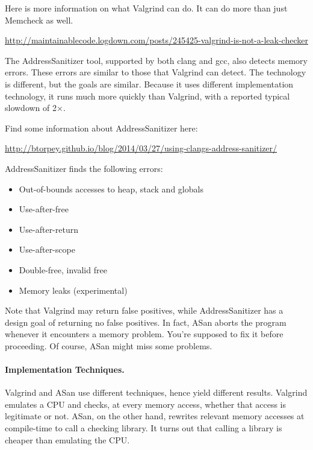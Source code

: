 \documentclass[11pt]{article}
\begin{document}
Here is more information on what Valgrind can do. It can do more than just
Memcheck as well.
\begin{center}
\url{http://maintainablecode.logdown.com/posts/245425-valgrind-is-not-a-leak-checker}
\end{center}

The AddressSanitizer tool, supported by both clang and gcc,
also detects memory errors. These errors are similar to those that
Valgrind can detect. The technology is different, but the goals are
similar. Because it uses different implementation technology, it runs
much more quickly than Valgrind, with a reported typical slowdown of
2$\times$.

\pagebreak
Find some information about AddressSanitizer here:
\vspace*{-1em}
\begin{center}
\url{http://btorpey.github.io/blog/2014/03/27/using-clangs-address-sanitizer/}
\end{center}
\vspace*{-1em}

AddressSanitizer finds the following errors:
\vspace*{-1em}
\begin{itemize}[noitemsep]
\item    Out-of-bounds accesses to heap, stack and globals
\item    Use-after-free
\item    Use-after-return
\item    Use-after-scope
\item    Double-free, invalid free
\item    Memory leaks (experimental)
\end{itemize}
\vspace*{-1em}

Note that Valgrind may return false positives, while AddressSanitizer has a design goal 
of returning no false positives. In fact, ASan aborts the program whenever it encounters
a memory problem. You're supposed to fix it before proceeding. Of course, ASan might miss 
some problems.

\paragraph{Implementation Techniques.}
Valgrind and ASan use different techniques, hence yield different results.
Valgrind emulates a CPU and checks, at every memory access, whether that
access is legitimate or not. ASan, on the other hand, rewrites relevant memory accesses
at compile-time to call a checking library. It turns out that calling a library is cheaper
than emulating the CPU.
\end{document}
